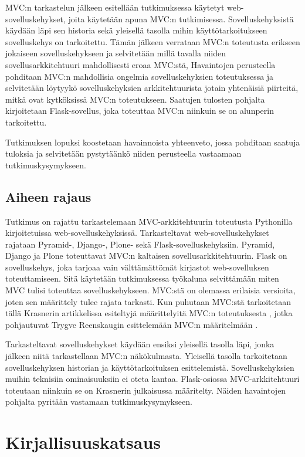 \documentclass[utf8]{gradu3}
\begin{document}
MVC:n tarkastelun jälkeen esitellään tutkimuksessa käytetyt web-sovelluskehykset, 
joita käytetään apuna MVC:n tutkimisessa. Sovelluskehyksistä käydään läpi sen 
historia sekä yleisellä tasolla mihin käyttötarkoitukseen
sovelluskehys on tarkoitettu. Tämän jälkeen verrataan MVC:n toteutusta erikseen 
jokaiseen sovelluskehykseen ja selvitetään millä tavalla niiden sovellusarkkitehtuuri 
mahdollisesti eroaa MVC:stä,
Havaintojen perusteella pohditaan MVC:n mahdollisia ongelmia sovelluskehyksien toteutuksessa 
ja selvitetään löytyykö sovelluskehyksien arkkitehtuurista jotain yhtenäisiä piirteitä, mitkä ovat
kytköksissä MVC:n toteutukseen. Saatujen tulosten pohjalta  kirjoitetaan Flask-sovellus, joka toteuttaa MVC:n 
niinkuin se on alunperin tarkoitettu.

Tutkimuksen lopuksi koostetaan havainnoista yhteenveto, jossa pohditaan saatuja tuloksia ja selvitetään 
pystytäänkö niiden perusteella vastaamaan tutkimuskysymykseen.


\section{Aiheen rajaus}
Tutkimus on rajattu tarkastelemaan MVC-arkkitehtuurin
toteutusta Pythonilla kirjoitetuissa
web-sovelluskehyksissä. Tarkasteltavat web-sovelluskehykset rajataan 
Pyramid-, Django-, Plone- sekä Flask-sovelluskehyksiin. Pyramid, Django ja Plone toteuttavat MVC:n kaltaisen
sovellusarkkitehtuurin. Flask on sovelluskehys, joka tarjoaa vain
välttämättömät kirjastot web-sovelluksen toteuttamiseen. Sitä
käytetään tutkimuksessa työkaluna selvittämään miten MVC tulisi
toteuttaa sovelluskehykseen. MVC:stä on olemassa erilaisia versioita, joten sen määrittely tulee rajata tarkasti.
Kun puhutaan MVC:stä tarkoitetaan tällä Krasnerin
artikkelissa esiteltyjä määrittelyitä MVC:n
toteutuksesta \parencite{krasner}, jotka pohjautuvat Trygve Reenskaugin esittelemään 
MVC:n määritelmään \parencite{xerox-original}. 

Tarkasteltavat sovelluskehykset käydään ensiksi yleisellä tasolla läpi, jonka jälkeen niitä tarkastellaan MVC:n näkökulmasta. Yleisellä tasolla tarkoitetaan sovelluskehyksen historian ja käyttötarkoituksen esittelemistä. Sovelluskehyksien muihin teknisiin ominaisuuksiin ei oteta kantaa. Flask-osiossa MVC-arkkitehtuuri toteutaan niinkuin se on Krasnerin julkaisussa määritelty. Näiden havaintojen pohjalta pyritään vastamaan tutkimuskysymykseen.


\chapter{Kirjallisuuskatsaus}
\end{document}
